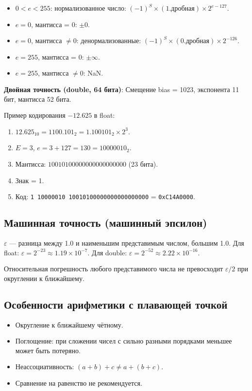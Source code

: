 \documentclass[a4paper,14pt]{report}
\begin{document}
\begin{itemize}
    \item $0 < e < 255$: нормализованное число: $(-1)^S \times (1.\text{дробная}) \times 2^{e-127}$.
    \item $e = 0$, мантисса = 0: $\pm 0$.
    \item $e = 0$, мантисса $\neq 0$: денормализованные: $(-1)^S \times (0.\text{дробная}) \times 2^{-126}$.
    \item $e = 255$, мантисса = 0: $\pm\infty$.
    \item $e = 255$, мантисса $\neq 0$: NaN.
\end{itemize}

\textbf{Двойная точность (double, 64 бита)}:
Смещение bias = 1023, экспонента 11 бит, мантисса 52 бита.

Пример кодирования $-12.625$ в float:
\begin{enumerate}
    \item $12.625_{10} = 1100.101_2 = 1.100101_2 \times 2^3$.
    \item $E=3$, $e=3+127=130=10000010_2$.
    \item Мантисса: $10010100000000000000000$ (23 бита).
    \item Знак = 1.
    \item Код: \texttt{1 10000010 10010100000000000000000} = \texttt{0xC14A0000}.
\end{enumerate}

\subsection{Машинная точность (машинный эпсилон)}
$\varepsilon$ — разница между 1.0 и наименьшим представимым числом, большим 1.0.
Для float: $\varepsilon = 2^{-23} \approx 1.19 \times 10^{-7}$.
Для double: $\varepsilon = 2^{-52} \approx 2.22 \times 10^{-16}$.

Относительная погрешность любого представимого числа не превосходит $\varepsilon/2$ при округлении к ближайшему.

\subsection{Особенности арифметики с плавающей точкой}
\begin{itemize}
    \item Округление к ближайшему чётному.
    \item Поглощение: при сложении чисел с сильно разными порядками меньшее может быть потеряно.
    \item Неассоциативность: $(a+b)+c \neq a+(b+c)$.
    \item Сравнение на равенство не рекомендуется.
\end{itemize}
\end{document}
